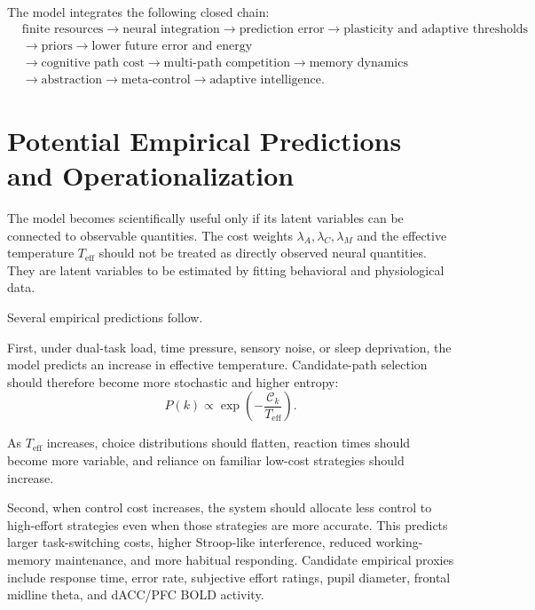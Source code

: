 \documentclass[11pt, a4paper]{article}
\begin{document}
The model integrates the following closed chain:
\begin{equation}
\begin{aligned}
&\text{finite resources}
\rightarrow
\text{neural integration}
\rightarrow
\text{prediction error}
\rightarrow
\text{plasticity and adaptive thresholds}
\\
&\rightarrow
\text{priors}
\rightarrow
\text{lower future error and energy}
\\
&\rightarrow
\text{cognitive path cost}
\rightarrow
\text{multi-path competition}
\rightarrow
\text{memory dynamics}
\\
&\rightarrow
\text{abstraction}
\rightarrow
\text{meta-control}
\rightarrow
\text{adaptive intelligence}.
\end{aligned}
\end{equation}

\section{Potential Empirical Predictions and Operationalization}

The model becomes scientifically useful only if its latent variables can be connected to observable quantities. The cost weights $\lambda_A,\lambda_C,\lambda_M$ and the effective temperature $T_{\mathrm{eff}}$ should not be treated as directly observed neural quantities. They are latent variables to be estimated by fitting behavioral and physiological data.

Several empirical predictions follow.

First, under dual-task load, time pressure, sensory noise, or sleep deprivation, the model predicts an increase in effective temperature. Candidate-path selection should therefore become more stochastic and higher entropy:
\begin{equation}
P(k)
\propto
\exp
\left(
-\frac{\mathcal{C}_k}{T_{\mathrm{eff}}}
\right).
\end{equation}

As $T_{\mathrm{eff}}$ increases, choice distributions should flatten, reaction times should become more variable, and reliance on familiar low-cost strategies should increase.

Second, when control cost increases, the system should allocate less control to high-effort strategies even when those strategies are more accurate. This predicts larger task-switching costs, higher Stroop-like interference, reduced working-memory maintenance, and more habitual responding. Candidate empirical proxies include response time, error rate, subjective effort ratings, pupil diameter, frontal midline theta, and dACC/PFC BOLD activity.
\end{document}
